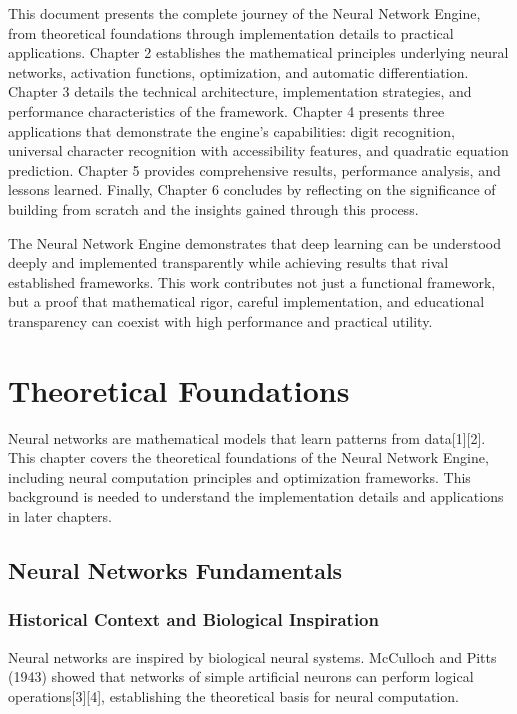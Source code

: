 \documentclass[11pt,a4paper]{report}
\begin{document}
This document presents the complete journey of the Neural Network Engine, from theoretical foundations through implementation details to practical applications. Chapter 2 establishes the mathematical principles underlying neural networks, activation functions, optimization, and automatic differentiation. Chapter 3 details the technical architecture, implementation strategies, and performance characteristics of the framework. Chapter 4 presents three applications that demonstrate the engine's capabilities: digit recognition, universal character recognition with accessibility features, and quadratic equation prediction. Chapter 5 provides comprehensive results, performance analysis, and lessons learned. Finally, Chapter 6 concludes by reflecting on the significance of building from scratch and the insights gained through this process.

The Neural Network Engine demonstrates that deep learning can be understood deeply and implemented transparently while achieving results that rival established frameworks. This work contributes not just a functional framework, but a proof that mathematical rigor, careful implementation, and educational transparency can coexist with high performance and practical utility.

\chapter{Theoretical Foundations}

Neural networks are mathematical models that learn patterns from data[1][2]. This chapter covers the theoretical foundations of the Neural Network Engine, including neural computation principles and optimization frameworks. This background is needed to understand the implementation details and applications in later chapters.

\section{Neural Networks Fundamentals}

\subsection{Historical Context and Biological Inspiration}

Neural networks are inspired by biological neural systems. McCulloch and Pitts (1943) showed that networks of simple artificial neurons can perform logical operations[3][4], establishing the theoretical basis for neural computation.
\end{document}

